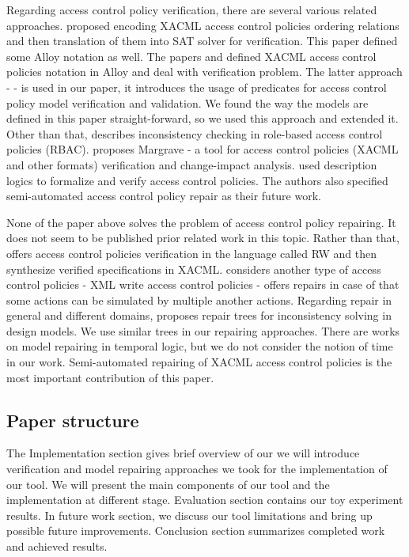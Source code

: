 \documentclass{acm_proc_article-sp}
\begin{document}
Regarding access control policy verification, there are several various related approaches.
\cite{Hughes:2008:AVA:1459278.1459282} proposed encoding XACML access control policies  ordering relations and then translation of them into SAT solver for verification. This paper defined some Alloy notation as well.  The papers \cite{acp:automated} and \cite{acp:alloy} defined XACML access control policies notation in Alloy and deal with verification problem. The latter approach - \cite{acp:alloy} - is used in our paper, it introduces the usage of predicates for access control policy model verification and validation. We found the way the models are defined in this paper straight-forward, so we used this approach and extended it. Other than that, \cite{4258517} describes inconsistency checking in role-based access control policies (RBAC). \cite{Fisler:2005:VCA:1062455.1062502} proposes Margrave - a tool for access control policies (XACML and other formats) verification and change-impact analysis. \cite {acp:descriptionlogics} used description logics to formalize and verify access control policies. The authors also specified semi-automated access control policy repair as their future work.

None of the paper above solves the problem of access control policy repairing. It does not seem to be published prior related work in this topic. Rather than that, \cite{Zhang:2004:SVA:1029133.1029141} offers access control policies verification in the language called RW and then synthesize verified specifications in XACML. \cite{Bravo:2007:RIX:1783534.1783545} considers another type of access control policies - XML write access control policies - offers repairs in case of that some actions can be simulated by multiple another actions. Regarding repair in general and different domains, \cite{Reder:2012:CRT:2351676.2351707} proposes repair trees for inconsistency solving in design models. We use similar trees in our repairing approaches. There are works on model repairing in temporal logic, but we do not consider the notion of time in our work. Semi-automated repairing of XACML access control policies is the most important contribution of this paper. 

\subsection{Paper structure}
The Implementation section gives brief overview of our we will introduce verification and model repairing approaches we took for the implementation of our tool. We will present the main components of our tool and the implementation at different stage. Evaluation section contains our toy experiment results. In future work section, we discuss our tool limitations and bring up possible future improvements. Conclusion section summarizes completed work and achieved results.
\end{document}
